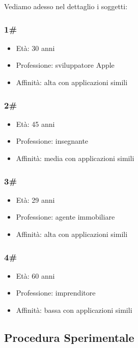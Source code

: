 \noindent
Vediamo adesso nel dettaglio i soggetti:
\subsubsection{1\#}
\begin{itemize}
  \item Età: 30 anni
  \item Professione: sviluppatore Apple
  \item Affinità: alta con applicazioni simili
\end{itemize}

\subsubsection{2\#}
\begin{itemize}
  \item Età: 45 anni
  \item Professione: insegnante
  \item Affinità: media con applicazioni simili
\end{itemize}

\subsubsection{3\#}
\begin{itemize}
  \item Età: 29 anni
  \item Professione: agente immobiliare
  \item Affinità: alta con applicazioni simili
\end{itemize}

\subsubsection{4\#}
\begin{itemize}
  \item Età: 60 anni
  \item Professione: imprenditore
  \item Affinità: bassa con applicazioni simili
\end{itemize}

\subsection{Procedura Sperimentale}

